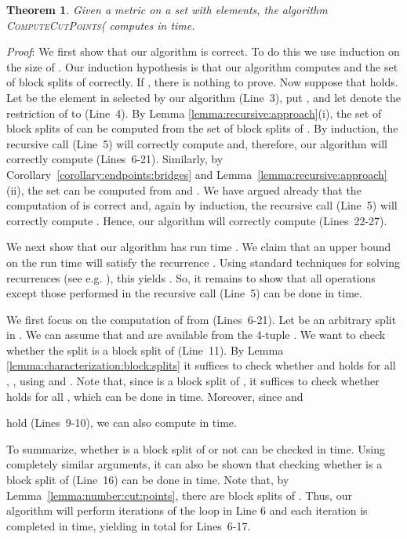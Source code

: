 \documentclass[12pt]{article}
\newtheorem{theorem}[prop]{Theorem}
\begin{document}
\begin{theorem}
\label{theorem:algorithm:cut:points}
Given a metric  on a set  with  elements, the
algorithm \textsc{ComputeCutPoints}( computes 
in  time.
\end{theorem}

\noindent\textsl{Proof}:
We first show that our algorithm is correct. To do this we use induction
on the size  of . Our induction hypothesis is that our
algorithm computes  and the set  of block splits of  correctly.
If , there is nothing to prove.
Now suppose that  holds. 
Let  be the element in  selected by our algorithm (Line~3), 
put , and let  denote
the restriction of  to  (Line~4).
By Lemma \ref{lemma:recursive:approach}(i), the set  of block splits of 
can be computed from the set  of block splits of .
By induction, the recursive call (Line~5) will correctly compute  and,
therefore, our algorithm will correctly compute  (Lines~6-21).
Similarly, by Corollary~\ref{corollary:endpoints:bridges}
and Lemma~\ref{lemma:recursive:approach}(ii), the set  can be computed
from  and . We have argued already that the computation
of  is correct and, again by induction, the recursive call (Line~5) 
will correctly compute . Hence, our algorithm will correctly 
compute  (Lines~22-27). 

We next show that our algorithm has run time .
We claim that an upper bound  on the run time
will satisfy the recurrence .
Using standard techniques for solving recurrences 
(see e.g. \cite{cormen:intro:algorithms:2001}),
this yields . So, it remains to show
that all operations except those performed in the recursive call (Line~5)
can be done in  time. 

We first focus on the computation of  from  (Lines~6-21).
Let  be an arbitrary split in . We can assume
that  and  are available 
from the 4-tuple .
We want to check whether the split 
 is a block split of  (Line~11).
By Lemma \ref{lemma:characterization:block:splits} it suffices to check
whether 
and  holds for all , ,
using  and .
Note that, since  is a block split of , it suffices to
check whether  holds for all , which can
be done in  time. 
Moreover, since 
 and

hold (Lines~9-10), we can also compute
 in  time. 

To summarize, whether  is a block split of  or not
can be checked in  time. Using completely similar arguments, it can
also be shown that checking whether  is a block split of  (Line~16)
can be done in  time. Note that, by Lemma~\ref{lemma:number:cut:points}, 
there are  block splits of .
Thus, our algorithm will perform  iterations of the loop in Line 6 
and each iteration is completed in  time, yielding  in total
for Lines~6-17.
\end{document}
